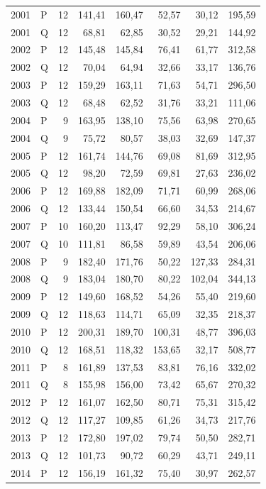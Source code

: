 \documentclass[10pt,a4paper]{article}
\begin{document}
\begin{longtable}{llrrrrrr}
2001 & P & 12 & 141,41 & 160,47 & 52,57 & 30,12 & 195,59 \\
2001 & Q & 12 & 68,81 & 62,85 & 30,52 & 29,21 & 144,92 \\
2002 & P & 12 & 145,48 & 145,84 & 76,41 & 61,77 & 312,58 \\
2002 & Q & 12 & 70,04 & 64,94 & 32,66 & 33,17 & 136,76 \\
2003 & P & 12 & 159,29 & 163,11 & 71,63 & 54,71 & 296,50 \\
2003 & Q & 12 & 68,48 & 62,52 & 31,76 & 33,21 & 111,06 \\
2004 & P & 9 & 163,95 & 138,10 & 75,56 & 63,98 & 270,65 \\
2004 & Q & 9 & 75,72 & 80,57 & 38,03 & 32,69 & 147,37 \\
2005 & P & 12 & 161,74 & 144,76 & 69,08 & 81,69 & 312,95 \\
2005 & Q & 12 & 98,20 & 72,59 & 69,81 & 27,63 & 236,02 \\
2006 & P & 12 & 169,88 & 182,09 & 71,71 & 60,99 & 268,06 \\
2006 & Q & 12 & 133,44 & 150,54 & 66,60 & 34,53 & 214,67 \\
2007 & P & 10 & 160,20 & 113,47 & 92,29 & 58,10 & 306,24 \\
2007 & Q & 10 & 111,81 & 86,58 & 59,89 & 43,54 & 206,06 \\
2008 & P & 9 & 182,40 & 171,76 & 50,22 & 127,33 & 284,31 \\
2008 & Q & 9 & 183,04 & 180,70 & 80,22 & 102,04 & 344,13 \\
2009 & P & 12 & 149,60 & 168,52 & 54,26 & 55,40 & 219,60 \\
2009 & Q & 12 & 118,63 & 114,71 & 65,09 & 32,35 & 218,37 \\
2010 & P & 12 & 200,31 & 189,70 & 100,31 & 48,77 & 396,03 \\
2010 & Q & 12 & 168,51 & 118,32 & 153,65 & 32,17 & 508,77 \\
2011 & P & 8 & 161,89 & 137,53 & 83,81 & 76,16 & 332,02 \\
2011 & Q & 8 & 155,98 & 156,00 & 73,42 & 65,67 & 270,32 \\
2012 & P & 12 & 161,07 & 162,50 & 80,71 & 75,31 & 315,42 \\
2012 & Q & 12 & 117,27 & 109,85 & 61,26 & 34,73 & 217,76 \\
2013 & P & 12 & 172,80 & 197,02 & 79,74 & 50,50 & 282,71 \\
2013 & Q & 12 & 101,73 & 90,72 & 60,29 & 43,71 & 249,11 \\
2014 & P & 12 & 156,19 & 161,32 & 75,40 & 30,97 & 262,57 \\

\end{longtable}
\end{document}
